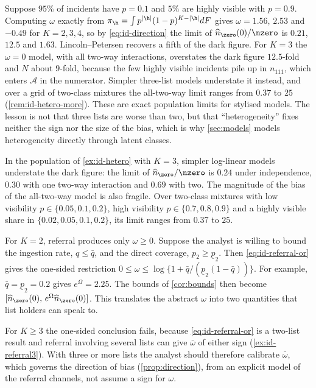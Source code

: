 \begin{example}\label{ex:id-hetero}
Suppose $95\%$ of incidents have $p=0.1$ and $5\%$ are highly visible with $p=0.9$. Computing $\omega$ exactly from $\pi_{\h}=\int p^{|\h|}(1-p)^{K-|\h|}dF$ gives $\omega=1.56$, $2.53$ and $-0.49$ for $K=2,3,4$, so by \eqref{eq:id-direction} the limit of $\widehat n_{\zero}(0)/\nzero$ is $0.21$, $12.5$ and $1.63$. Lincoln--Petersen recovers a fifth of the dark figure. For $K=3$ the $\omega=0$ model, with all two-way interactions, overstates the dark figure $12.5$-fold and $N$ about $9$-fold, because the few highly visible incidents pile up in $n_{111}$, which enters $\mathcal A$ in the numerator. Simpler three-list models understate it instead, and over a grid of two-class mixtures the all-two-way limit ranges from $0.37$ to $25$ (\cref{rem:id-hetero-more}). These are exact population limits for stylised models. The lesson is not that three lists are worse than two, but that ``heterogeneity'' fixes neither the sign nor the size of the bias, which is why \cref{sec:models} models heterogeneity directly through latent classes.
\end{example}

\begin{remark}\label{rem:id-hetero-more}
In the population of \cref{ex:id-hetero} with $K=3$, simpler log-linear models understate the dark figure: the limit of $\widehat n_{\zero}/\nzero$ is $0.24$ under independence, $0.30$ with one two-way interaction and $0.69$ with two. The magnitude of the bias of the all-two-way model is also fragile. Over two-class mixtures with low visibility $p\in\{0.05,0.1,0.2\}$, high visibility $p\in\{0.7,0.8,0.9\}$ and a highly visible share in $\{0.02,0.05,0.1,0.2\}$, its limit ranges from $0.37$ to $25$.
\end{remark}

\begin{remark}\label{rem:id-calibrate}
For $K=2$, referral produces only $\omega\ge0$. Suppose the analyst is willing to bound the ingestion rate, $q\le\bar q$, and the direct coverage, $p_2\ge\underline p_2$. Then \eqref{eq:id-referral-or} gives the one-sided restriction $0\le\omega\le\log\{1+\bar q/(\underline p_2(1-\bar q))\}$. For example, $\bar q=\underline p_2=0.2$ gives $e^{\Omega}=2.25$. The bounds of \cref{cor:bounds} then become $[\widehat n_{\zero}(0),\,e^{\Omega}\widehat n_{\zero}(0)]$. This translates the abstract $\omega$ into two quantities that list holders can speak to.

For $K\ge3$ the one-sided conclusion fails, because \eqref{eq:id-referral-or} is a two-list result and referral involving several lists can give $\bar\omega$ of either sign (\cref{ex:id-referral3}). With three or more lists the analyst should therefore calibrate $\bar\omega$, which governs the direction of bias (\cref{prop:direction}), from an explicit model of the referral channels, not assume a sign for $\omega$.
\end{remark}

